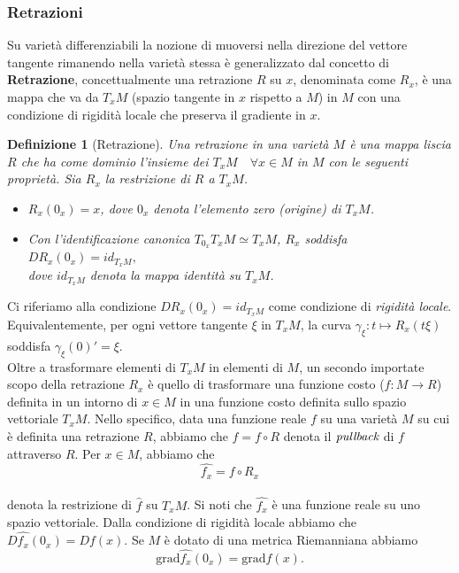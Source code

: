 \documentclass[a4paper, 12pt]{article}
\newtheorem{definition}{Definizione}
\begin{document}
\subsubsection{Retrazioni} \label{retraction}
Su varietà differenziabili la nozione di muoversi nella direzione del vettore tangente rimanendo nella varietà stessa è generalizzato dal concetto di \textbf{Retrazione}, concettualmente una retrazione $R$ su $x$, denominata come $R_x$, è una mappa che va da $T_xM$ (spazio tangente in $x$ rispetto a $M$) in $M$ con una condizione di rigidità locale che preserva il gradiente in $x$.
\begin{definition}[Retrazione]
Una retrazione in una varietà $M$ è una mappa liscia $R$ che ha come dominio l'insieme dei $T_xM \quad \forall x \in M$ in $M$ con le seguenti proprietà. Sia $R_x$ la restrizione di $R$ a $T_xM$.
\begin{itemize}
  \item $R_x(0_x) = x$, dove $0_x$ denota l'elemento zero (origine) di $T_xM$.
  \item Con l'identificazione canonica $T_{0_x} T_xM \simeq T_xM$, $R_x$ soddisfa\\
  $DR_x(0_x) = id_{T_xM},$\\
  dove $id_{T_xM}$ denota la mappa identità su $T_xM$.
\end{itemize}
\end{definition}
Ci riferiamo alla condizione $DR_x(0_x) = id_{T_xM}$ come condizione di \emph{rigidità locale}. Equivalentemente, per ogni vettore tangente $\xi$ in $T_xM$, la curva $\gamma_{\xi}:t \mapsto R_x(t\xi)$ soddisfa $\gamma_{\xi}(0)' = \xi$.\\
Oltre a trasformare elementi di $T_xM$ in elementi di $M$, un secondo importate scopo della retrazione $R_x$ è quello di trasformare una funzione costo ($f:M \to R$) definita in un intorno di $x \in M$ in una funzione costo definita sullo spazio vettoriale $T_xM$. Nello specifico, data una funzione reale $f$ su una varietà $M$ su cui è definita una retrazione $R$, abbiamo che $\hat{f} = f \circ R$ denota il $\emph{pullback}$ di $f$ attraverso $R$. Per $x \in M$, abbiamo che\\
\[\hat{f_x} = f \circ R_x\]\\
denota la restrizione di $\hat{f}$ su $T_xM$. Si noti che $\hat{f_x}$ è una funzione reale su uno spazio vettoriale. Dalla condizione di rigidità locale abbiamo che $D\hat{f_x}(0_x) = Df(x)$. Se $M$ è dotato di una metrica Riemanniana abbiamo\\
\[ \mbox{grad} \hat{f_x}(0_x) = \mbox{grad} f(x).\]\\
\end{document}
